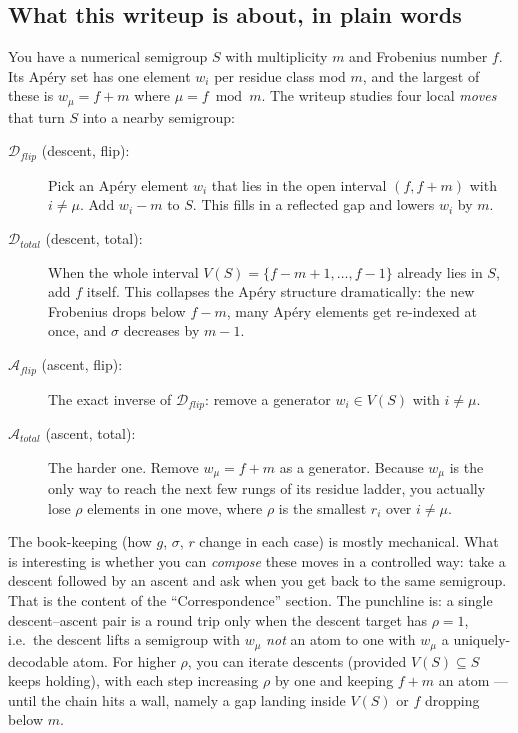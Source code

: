 \documentclass[11pt, a4paper]{article}
\begin{document}
\subsection*{What this writeup is about, in plain words}

You have a numerical semigroup $S$ with multiplicity $m$ and
Frobenius number $f$. Its Apéry set has one element $w_i$ per
residue class mod $m$, and the largest of these is
$w_\mu = f + m$ where $\mu = f \bmod m$. The writeup studies four
local \emph{moves} that turn $S$ into a nearby semigroup:

\begin{description}
    \item[$\mathcal{D}_{flip}$ (descent, flip):] Pick an Apéry
    element $w_i$ that lies in the open interval $(f, f+m)$ with
    $i \neq \mu$. Add $w_i - m$ to $S$. This fills in a reflected
    gap and lowers $w_i$ by $m$.
    \item[$\mathcal{D}_{total}$ (descent, total):] When the whole
    interval $V(S) = \{f-m+1,\dots,f-1\}$ already lies in $S$, add
    $f$ itself. This collapses the Apéry structure dramatically:
    the new Frobenius drops below $f-m$, many Apéry elements get
    re-indexed at once, and $\sigma$ decreases by $m-1$.
    \item[$\mathcal{A}_{flip}$ (ascent, flip):] The exact inverse
    of $\mathcal{D}_{flip}$: remove a generator $w_i \in V(S)$ with
    $i \neq \mu$.
    \item[$\mathcal{A}_{total}$ (ascent, total):] The harder one.
    Remove $w_\mu = f + m$ as a generator. Because $w_\mu$ is the
    only way to reach the next few rungs of its residue ladder, you
    actually lose $\rho$ elements in one move, where $\rho$ is the
    smallest $r_i$ over $i \neq \mu$.
\end{description}

The book-keeping (how $g$, $\sigma$, $r$ change in each case) is
mostly mechanical. What is interesting is whether you can
\emph{compose} these moves in a controlled way: take a descent
followed by an ascent and ask when you get back to the same
semigroup. That is the content of the ``Correspondence'' section.
The punchline is: a single descent--ascent pair is a round trip
only when the descent target has $\rho = 1$, i.e.\ the descent
lifts a semigroup with $w_\mu$ \emph{not} an atom to one with
$w_\mu$ a uniquely-decodable atom. For higher $\rho$, you can
iterate descents (provided $V(S) \subseteq S$ keeps holding), with
each step increasing $\rho$ by one and keeping $f + m$ an atom ---
until the chain hits a wall, namely a gap landing inside $V(S)$ or
$f$ dropping below $m$.
\end{document}
